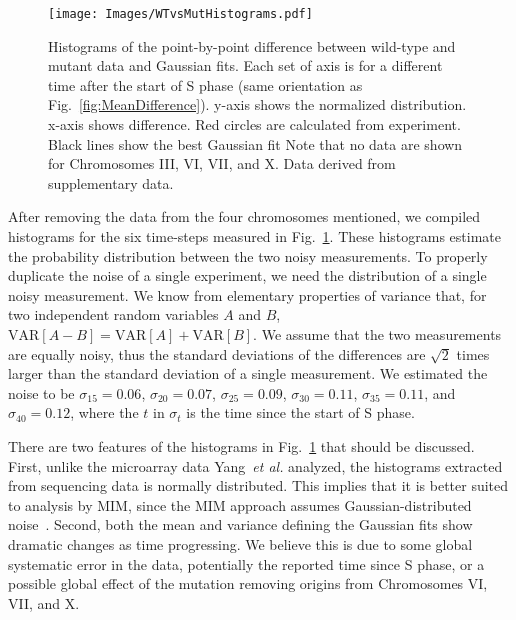 		\begin{figure}[tbh!]
			\begin{center}
				\texttt{[image: Images/WTvsMutHistograms.pdf]}
			\end{center}
				\caption[Estimating Experimental Noise B]{\label{fig:HistDifference} Histograms of the point-by-point difference between wild-type and mutant data and Gaussian fits.
					Each set of axis is for a different time after the start of S phase (same orientation as Fig.~\ref{fig:MeanDifference}).
					y-axis shows the normalized distribution.
					x-axis shows difference.
					Red circles are calculated from experiment.
					Black lines show the best Gaussian fit
					Note that no data are shown for Chromosomes III, VI, VII, and X.
					Data derived from~\cite{StochasticTermination} supplementary data.
				}
		\end{figure}
		
		After removing the data from the four chromosomes mentioned, we compiled histograms for the six time-steps measured in Fig.~\ref{fig:HistDifference}.
		These histograms estimate the probability distribution between the two noisy measurements.
		To properly duplicate the noise of a single experiment, we need the distribution of a single noisy measurement.
		We know from elementary properties of variance that, for two independent random variables $A$ and $B$, $\text{VAR}[A-B] = \text{VAR}[A] + \text{VAR}[B]$.
		We assume that the two measurements are equally noisy, thus the standard deviations of the differences are $\sqrt{2}$ times larger than the standard deviation of a single measurement.
		We estimated the noise to be $\sigma_{15}=0.06$, $\sigma_{20}=0.07$, $\sigma_{25}=0.09$, $\sigma_{30}=0.11$, $\sigma_{35}=0.11$, and $\sigma_{40}=0.12$, where the $t$ in $\sigma_t$ is the time since the start of S phase.
		
		There are two features of the histograms in Fig.~\ref{fig:HistDifference} that should be discussed.
		First, unlike the microarray data Yang~\emph{et al.} analyzed, the histograms extracted from sequencing data is normally distributed.
		This implies that it is better suited to analysis by MIM, since the MIM approach assumes Gaussian-distributed noise~\cite{ScottsPaper}.
		Second, both the mean and variance defining the Gaussian fits show dramatic changes as time progressing.
		We believe this is due to some global systematic error in the data, potentially the reported time since S phase, or a possible global effect of the mutation removing origins from Chromosomes VI, VII, and X.
		
